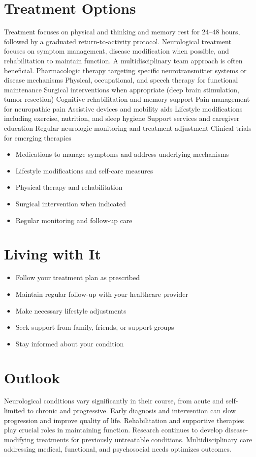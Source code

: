 \section{Treatment Options}
Treatment focuses on physical and thinking and memory rest for 24--48 hours, followed by a graduated return-to-activity protocol. Neurological treatment focuses on symptom management, disease modification when possible, and rehabilitation to maintain function. A multidisciplinary team approach is often beneficial. Pharmacologic therapy targeting specific neurotransmitter systems or disease mechanisms Physical, occupational, and speech therapy for functional maintenance Surgical interventions when appropriate (deep brain stimulation, tumor resection) Cognitive rehabilitation and memory support Pain management for neuropathic pain Assistive devices and mobility aids Lifestyle modifications including exercise, nutrition, and sleep hygiene Support services and caregiver education Regular neurologic monitoring and treatment adjustment Clinical trials for emerging therapies

\begin{itemize}[noitemsep]
  \item Medications to manage symptoms and address underlying mechanisms
  \item Lifestyle modifications and self-care measures
  \item Physical therapy and rehabilitation
  \item Surgical intervention when indicated
  \item Regular monitoring and follow-up care
\end{itemize}
\section{Living with It}
\begin{itemize}[noitemsep]
  \item Follow your treatment plan as prescribed
  \item Maintain regular follow-up with your healthcare provider
  \item Make necessary lifestyle adjustments
  \item Seek support from family, friends, or support groups
  \item Stay informed about your condition
\end{itemize}
\section{Outlook}
Neurological conditions vary significantly in their course, from acute and self-limited to chronic and progressive. Early diagnosis and intervention can slow progression and improve quality of life. Rehabilitation and supportive therapies play crucial roles in maintaining function. Research continues to develop disease-modifying treatments for previously untreatable conditions. Multidisciplinary care addressing medical, functional, and psychosocial needs optimizes outcomes.
